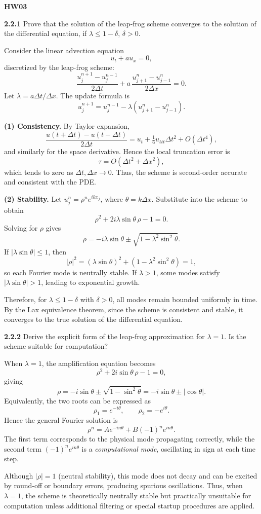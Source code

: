 \documentclass[12pt,a4paper]{article}
\begin{document}
\noindent \textbf{HW03}

\vspace{1em}

\noindent \textbf{2.2.1} \quad 
Prove that the solution of the leap-frog scheme converges to the solution of the differential equation, if $\lambda \le 1-\delta$, $\delta > 0$.

\medskip

Consider the linear advection equation
\[
u_t + a u_x = 0,
\]
discretized by the leap-frog scheme:
\[
\frac{u_j^{n+1} - u_j^{n-1}}{2\Delta t} 
+ a\,\frac{u_{j+1}^n - u_{j-1}^n}{2\Delta x} = 0.
\]
Let $\lambda = a\Delta t / \Delta x$. The update formula is
\[
u_j^{n+1} = u_j^{n-1} - \lambda (u_{j+1}^n - u_{j-1}^n).
\]

\textbf{(1) Consistency.}
By Taylor expansion,
\[
\frac{u(t+\Delta t)-u(t-\Delta t)}{2\Delta t}
= u_t + \tfrac{1}{6}u_{ttt}\Delta t^2 + O(\Delta t^4),
\]
and similarly for the space derivative. Hence the local truncation error is
\[
\tau = O(\Delta t^2 + \Delta x^2),
\]
which tends to zero as $\Delta t, \Delta x \to 0$. Thus, the scheme is second-order accurate and consistent with the PDE.

\textbf{(2) Stability.}
Let $u_j^n = \rho^n e^{i k x_j}$, where $\theta = k \Delta x$.  
Substitute into the scheme to obtain
\[
\rho^2 + 2i\lambda \sin\theta \,\rho - 1 = 0.
\]
Solving for $\rho$ gives
\[
\rho = -i\lambda \sin\theta \pm \sqrt{1 - \lambda^2 \sin^2\theta}.
\]
If $|\lambda \sin\theta| \le 1$, then
\[
|\rho|^2 = (\lambda \sin\theta)^2 + (1 - \lambda^2 \sin^2\theta) = 1,
\]
so each Fourier mode is neutrally stable.  
If $\lambda > 1$, some modes satisfy $|\lambda \sin\theta| > 1$, leading to exponential growth.

Therefore, for $\lambda \le 1-\delta$ with $\delta>0$, all modes remain bounded uniformly in time.  
By the Lax equivalence theorem, since the scheme is consistent and stable, it converges to the true solution of the differential equation.

\bigskip
\noindent \textbf{2.2.2} \quad 
Derive the explicit form of the leap-frog approximation for $\lambda=1$. Is the scheme suitable for computation?

\medskip

When $\lambda=1$, the amplification equation becomes
\[
\rho^2 + 2i\sin\theta\,\rho - 1 = 0,
\]
giving
\[
\rho = -i\sin\theta \pm \sqrt{1 - \sin^2\theta}
      = -i\sin\theta \pm |\cos\theta|.
\]
Equivalently, the two roots can be expressed as
\[
\rho_1 = e^{-i\theta}, \qquad 
\rho_2 = -e^{i\theta}.
\]
Hence the general Fourier solution is
\[
\rho^n = A e^{-in\theta} + B(-1)^n e^{in\theta}.
\]
The first term corresponds to the physical mode propagating correctly,  
while the second term $(-1)^n e^{in\theta}$ is a \emph{computational mode}, 
oscillating in sign at each time step.

Although $|\rho|=1$ (neutral stability), this mode does not decay and can be excited by round-off or boundary errors, producing spurious oscillations.  
Thus, when $\lambda=1$, the scheme is theoretically neutrally stable but practically unsuitable for computation unless additional filtering or special startup procedures are applied.
\end{document}
